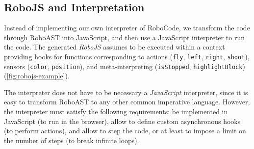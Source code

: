 
\subsection{RoboJS and Interpretation}
\label{sec:robomission-robojs}

Instead of implementing our own interpreter of RoboCode,
we transform the code through RoboAST into JavaScript,
and then use a JavaScript interpreter to run the code.
The generated \emph{RoboJS} %
assumes to be executed within a
context providing hooks for functions corresponding to actions (\texttt{fly}, \texttt{left}, \texttt{right}, \texttt{shoot}),
sensors (\texttt{color}, \texttt{position}),
and meta-interpreting (\texttt{isStopped}, \texttt{highlightBlock})
(\cref{fig:robojs-example}).

The interpreter does not have to be necessary a \emph{JavaScript} interpreter,
since it is easy to transform RoboAST to any other common imperative language.
However, the interpreter must satisfy the following requirements:
be implemented in JavaScript (to run in the browser),
allow to define custom asynchronous hooks
(to perform actions),
and allow to step the code, or at least to impose a limit on
the number of steps %
(to break infinite loops).




